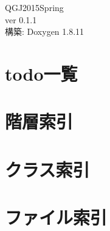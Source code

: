 \documentclass[twoside]{book}
\newcommand{\+}{\discretionary{\mbox{\scriptsize$\hookleftarrow$}}{}{}}
\newcommand{\clearemptydoublepage}{%
  \newpage{\pagestyle{empty}\cleardoublepage}%
}
\begin{document}
\hypersetup{pageanchor=false,
             bookmarksnumbered=true,
             pdfencoding=unicode
            }
\begin{titlepage}
\vspace*{7cm}
\begin{center}%
{\Large Q\+G\+J2015\+Spring \\[1ex]\large ver 0.\+1.\+1 }\\
\vspace*{1cm}
{\large 構築\+: Doxygen 1.8.11}\\
\end{center}
\end{titlepage}
\clearemptydoublepage
\tableofcontents
\clearemptydoublepage
{}
\hypersetup{pageanchor=true}

\chapter{todo一覧}
\label{todo}
\hypertarget{todo}{}

\chapter{階層索引}

\chapter{クラス索引}

\chapter{ファイル索引}

\end{document}
